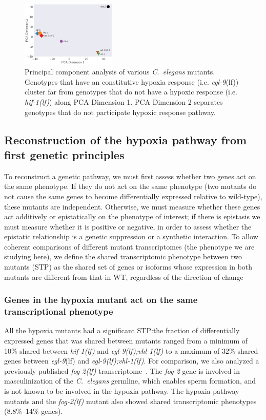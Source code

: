 \documentclass[9pt,twocolumn,twoside,lineno]{pnas-new}
\newcommand{\cel}{\emph{C.~elegans}}
\newcommand{\gene}[1]{\mbox{\emph{#1}}}
\newcommand{\fog}{\gene{fog-2(lf)}}
\newcommand{\egl}{\gene{egl-9}(lf)}
\newcommand{\eglvhl}{\gene{egl-9(lf);vhl-1(lf)}}
\newcommand{\hif}{\gene{hif-1(lf)}}
\begin{document}
\begin{figure}[tbhp]
  \centering
  \includegraphics[width=0.4\textwidth]{../figs/pca.pdf}
  \caption{
    Principal component analysis of various \cel{} mutants. Genotypes that have
    an constitutive hypoxia response (i.e. \egl{}) cluster far from genotypes
    that do not have a hypoxic response (i.e. \hif{}) along PCA Dimension 1. PCA
    Dimension 2 separates genotypes that do not participate hypoxic response
    pathway.
  }
\label{fig:pca}
\end{figure}

\subsection*{Reconstruction of the hypoxia pathway from first genetic principles}
\label{sec:reconstruct}
To reconstruct a genetic pathway, we must first assess whether two genes act on
the same phenotype. If they do not act on the same phenotype (two mutants do not
cause the same genes to become differentially expressed relative to wild-type),
these mutants are independent. Otherwise, we must measure whether these genes
act additively or epistatically on the phenotype of interest; if there is
epistasis we must measure whether it is positive or negative, in order to assess
whether the epistatic relationship is a genetic suppression or a synthetic
interaction. To allow coherent comparisons of different mutant transcriptomes
(the phenotype we are studying here), we define the shared transcriptomic
phenotype between two mutants (STP) as the shared set of genes or isoforms whose
expression in both mutants are different from that in WT, regardless of the
direction of change

\subsubsection*{Genes in the hypoxia mutant act on the same transcriptional
                phenotype}
\label{sec:phenotypes}
All the hypoxia mutants had a significant STP:\@ the fraction of differentially
expressed genes that was shared between mutants ranged from a minimum of 10\%
shared between \hif{} and \eglvhl{} to a maximum of 32\% shared genes between
\egl{} and \eglvhl{}. For comparison, we also analyzed a previously published
\fog{} transcriptome~\cite{Angeles-Albores2016a}. The \gene{fog-2} gene is
involved in masculinization of the \cel{} germline, which enables sperm
formation, and is not known to be involved in the hypoxia pathway. The hypoxia
pathway mutants and the \fog{} mutant also showed shared transcriptomic
phenotypes (8.8\%--14\% genes).
\end{document}
